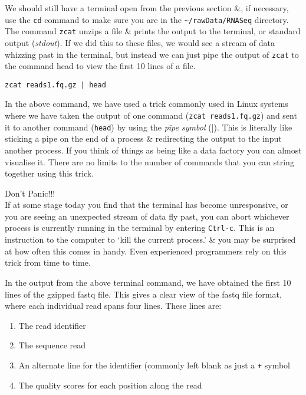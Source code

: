 \begin{steps}
We should still have a terminal open from the previous section \&, if necessary, use the \texttt{cd} command to make sure you are in the \texttt{\~{}/rawData/RNASeq} directory.
The command \texttt{zcat} unzips a file \& prints the output to the terminal, or standard output (\textit{stdout}).
If we did this to these files, we would see a stream of data whizzing past in the terminal, but instead we can just pipe the output of \texttt{zcat} to the command head to view the first 10 lines of a file. \\
\begin{lstlisting}
zcat reads1.fq.gz | head
\end{lstlisting}
\end{steps}

\begin{information}
In the above command, we have used a trick commonly used in Linux systems where we have taken the output of one command (\texttt{zcat reads1.fq.gz}) and sent it to another command (\texttt{head}) by using the \textit{pipe symbol} (|).
This is literally like sticking a pipe on the end of a process \& redirecting the output to the input another process.
If you think of things as being like a data factory you can almost visualise it.
There are no limits to the number of commands that you can string together using this trick. \\
\end{information}

\begin{warning}
\large{Don't Panic!!!} \\
\normalsize
If at some stage today you find that the terminal has become unresponsive, or you are seeing an unexpected stream of data fly past, you can abort whichever process is currently running in the terminal by entering \texttt{Ctrl-c}.
This is an instruction to the computer to `kill the current process.' \& you may be surprised at how often this comes in handy.
Even experienced programmers rely on this trick from time to time.
\end{warning}

\begin{note}
In the output from the above terminal command, we have obtained the first 10 lines of the gzipped fastq file.
This gives a clear view of the fastq file format, where each individual read spans four lines.
These lines are:
\begin{enumerate}
\item The read identifier
\item The sequence read
\item An alternate line for the identifier (commonly left blank as just a \texttt{+} symbol
\item The quality scores for each position along the read
\end{enumerate}
\end{note}

